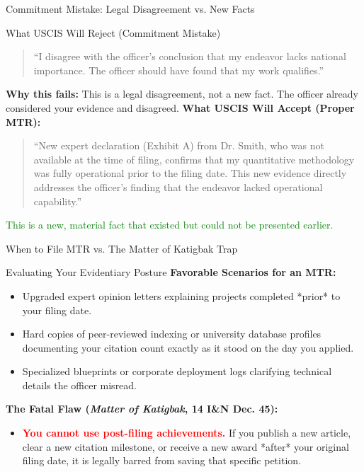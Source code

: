 \documentclass[11pt]{beamer}
\begin{document}
	\begin{frame}{Commitment Mistake: Legal Disagreement vs. New Facts}
		\scriptsize
		\begin{block}{What USCIS Will Reject (Commitment Mistake)}
			\begin{quote}
				``I disagree with the officer's conclusion that my endeavor lacks national importance. The officer should have found that my work qualifies.''
			\end{quote}
			\textbf{Why this fails:} This is a legal disagreement, not a new fact. The officer already considered your evidence and disagreed.
			\vspace{0.3cm}
			\textbf{What USCIS Will Accept (Proper MTR):}
			\begin{quote}
				``New expert declaration (Exhibit A) from Dr. Smith, who was not available at the time of filing, confirms that my quantitative methodology was fully operational prior to the filing date. This new evidence directly addresses the officer's finding that the endeavor lacked operational capability.''
			\end{quote}
			\textcolor{green}{This is a new, material fact that existed but could not be presented earlier.}
		\end{block}
	\end{frame}
	
	\begin{frame}{When to File MTR vs. The Matter of Katigbak Trap}
		\scriptsize
		\begin{block}{Evaluating Your Evidentiary Posture}
			\textbf{Favorable Scenarios for an MTR:}
			\begin{itemize}
				\item Upgraded expert opinion letters explaining projects completed *prior* to your filing date.
				\item Hard copies of peer-reviewed indexing or university database profiles documenting your citation count exactly as it stood on the day you applied.
				\item Specialized blueprints or corporate deployment logs clarifying technical details the officer misread.
			\end{itemize}
			\textbf{The Fatal Flaw (\textit{Matter of Katigbak}, 14 I\&N Dec. 45):}
			\begin{itemize}
				\item \textcolor{red}{\textbf{You cannot use post-filing achievements.}} If you publish a new article, clear a new citation milestone, or receive a new award *after* your original filing date, it is legally barred from saving that specific petition.
			\end{itemize}
		\end{block}
	\end{frame}
	
\end{document}
